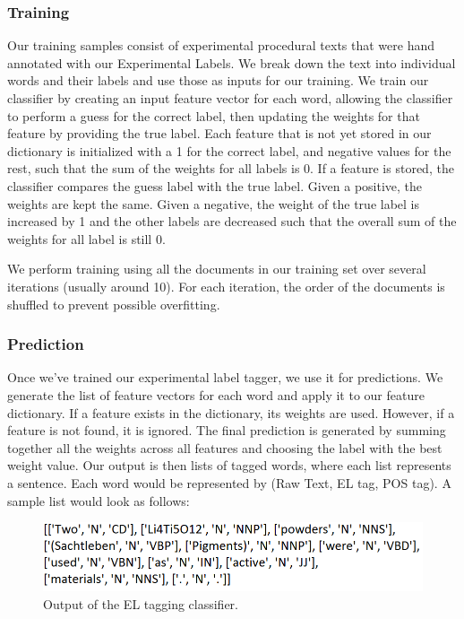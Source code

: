 \subsubsection{Training}
Our training samples consist of experimental procedural texts that were hand annotated with our Experimental Labels. We break down the text into individual words and their labels and use those as inputs for our training. We train our classifier by creating an input feature vector for each word, allowing the classifier to perform a guess for the correct label, then updating the weights for that feature by providing the true label. Each feature that is not yet stored in our dictionary is initialized with a 1 for the correct label, and negative values for the rest, such that the sum of the weights for all labels is 0. If a feature is stored, the classifier compares the guess label with the true label. Given a positive, the weights are kept the same. Given a negative, the weight of the true label is increased by 1 and the other labels are decreased such that the overall sum of the weights for all label is still 0. 

We perform training using all the documents in our training set over several iterations (usually around 10). For each iteration, the order of the documents is shuffled to prevent possible overfitting. 

\subsubsection{Prediction}
Once we've trained our experimental label tagger, we use it for predictions. We generate the list of feature vectors for each word and apply it to our feature dictionary. If a feature exists in the dictionary, its weights are used. However, if a feature is not found, it is ignored. The final prediction is generated by summing together all the weights across all features and choosing the label with the best weight value. Our output is then lists of tagged words, where each list represents a sentence. Each word would be represented by (Raw Text, EL tag, POS tag). A sample list would look as follows:

\begin{figure}
  \centering
    \includegraphics[width=.5\textwidth]{taggerout.png}
  \caption{Output of the EL tagging classifier.}
\end{figure}

